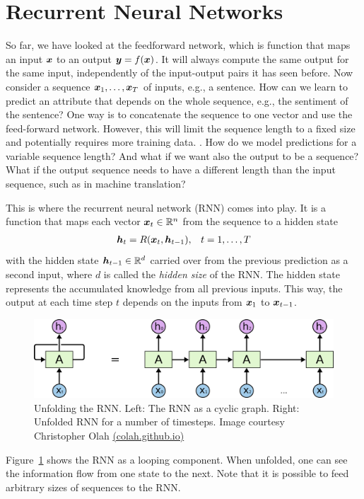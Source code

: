 	\section{Recurrent Neural Networks}\label{sec:recurrent_neural_networks}
		\newcommand{\imagecourtesycolah}{Image courtesy Christopher Olah \mbox{\href{http://colah.github.io/}{(colah.github.io)}}}
		So far, we have looked at the feedforward network, which is function that maps an input $\bm{x}$ to an output $\bm{y} = f(\bm{x})$.
		It will always compute the same output for the same input, independently of the input-output pairs it has seen before.
		Now consider a sequence $\bm{x}_1, \dots, \bm{x}_T$ of inputs, e.g., a sentence.
		How can we learn to predict an attribute that depends on the whole sequence, e.g., the sentiment of the sentence?
		One way is to concatenate the sequence to one vector and use the feed-forward network.
		However, this will limit the sequence length to a fixed size and potentially requires more training data.
		.
		How do we model predictions for a variable sequence length?
		And what if we want also the output to be a sequence? 
		What if the output sequence needs to have a different length than the input sequence, such as in machine translation? 
		
		This is where the recurrent neural network (RNN) comes into play.
		It is a function that maps each vector $\bm{x}_t \in \mathbb{R}^n$ from the sequence to a hidden state
		\begin{eqnarray}
			\bm{h}_t = R(\bm{x}_t, \bm{h}_{t-1}), & &t = 1, \dots, T
		\end{eqnarray}
		with the hidden state $\bm{h}_{t-1} \in \mathbb{R}^d$ carried over from the previous prediction as a second input, where $d$ is called the \emph{hidden size} of the RNN. 
		The hidden state represents the accumulated knowledge from all previous inputs.
		This way, the output at each time step $t$ depends on the inputs from $\bm{x}_1$ to $\bm{x}_{t - 1}$.
		\begin{figure}[tb]
			\centering
			\includegraphics[width=0.9\linewidth]{Images/LSTM/RNN-unrolled}
			\caption[Unfolding the RNN]
			{Unfolding the RNN. Left: The RNN as a cyclic graph. 
				Right: Unfolded RNN for a number of timesteps.
				\imagecourtesycolah}
			\label{fig:RNN-unrolled}
		\end{figure}
		Figure~\ref{fig:RNN-unrolled} shows the RNN as a looping component.
		When unfolded, one can see the information flow from one state to the next.
		Note that it is possible to feed arbitrary sizes of sequences to the RNN.
		
